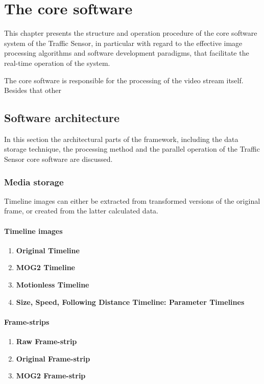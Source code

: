 \chapter{The core software}\label{chap:Core software}
This chapter presents the structure and operation procedure of the core software system of the Traffic Sensor, in particular with regard to the effective image processing algorithms and software development paradigms, that facilitate the real-time operation of the system.

The core software is responsible for the processing of the video stream itself.
Besides that other 
\section{Software architecture}
In this section the architectural parts of the framework, including the data storage technique, the processing method and the parallel operation of the Traffic Sensor core software are discussed.

\subsection{Media storage}
Timeline images can either be extracted from transformed versions of the original frame, or created from the latter calculated data.

\subsubsection{Timeline images}
\begin{enumerate}
	\item \textbf{Original Timeline}
	\item \textbf{MOG2 Timeline} 
	\item \textbf{Motionless Timeline}
	\item \textbf{Size, Speed, Following Distance Timeline: Parameter Timelines}
\end{enumerate}

\subsubsection{Frame-strips}
\begin{enumerate}
	\item \textbf{Raw Frame-strip}
	\item \textbf{Original Frame-strip}
	\item \textbf{MOG2 Frame-strip}
\end{enumerate}

